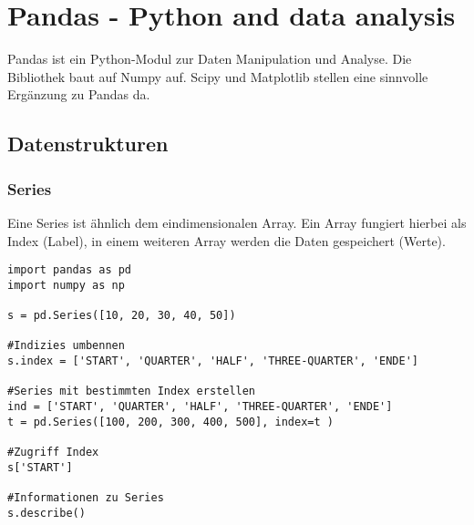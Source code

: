 \chapter{Pandas - Python and data analysis}
Pandas ist ein Python-Modul zur Daten Manipulation und Analyse. Die Bibliothek baut auf Numpy auf. Scipy und Matplotlib stellen eine sinnvolle Ergänzung zu Pandas da.
\section{Datenstrukturen}
\subsection{Series}
Eine Series ist ähnlich dem eindimensionalen Array. Ein Array fungiert hierbei als Index (Label), in einem weiteren Array werden die Daten gespeichert (Werte).
\begin{lstlisting}
import pandas as pd
import numpy as np

s = pd.Series([10, 20, 30, 40, 50])

#Indizies umbennen
s.index = ['START', 'QUARTER', 'HALF', 'THREE-QUARTER', 'ENDE']

#Series mit bestimmten Index erstellen
ind = ['START', 'QUARTER', 'HALF', 'THREE-QUARTER', 'ENDE']
t = pd.Series([100, 200, 300, 400, 500], index=t )

#Zugriff Index
s['START']

#Informationen zu Series
s.describe()
\end{lstlisting}

